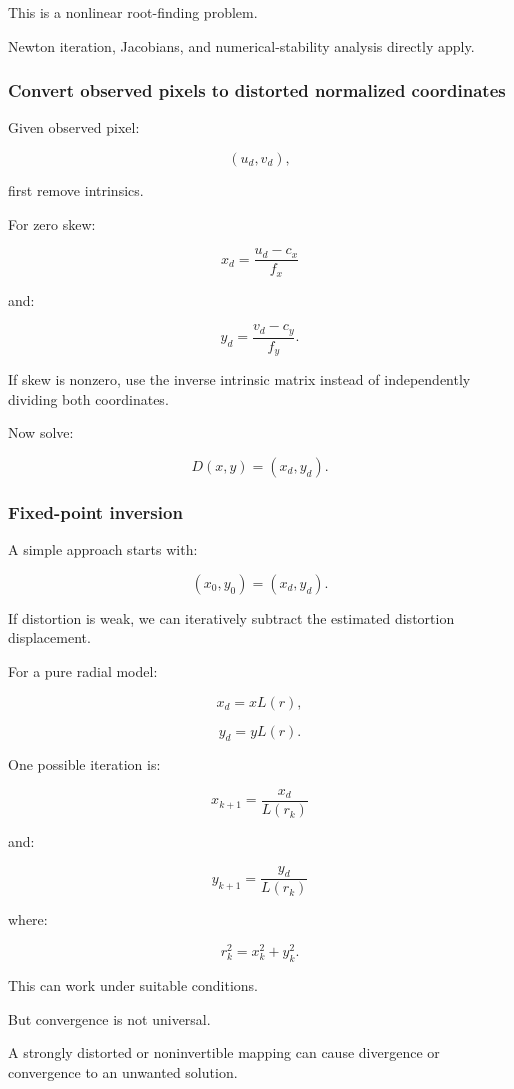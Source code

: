 This is a nonlinear root-finding problem.

Newton iteration, Jacobians, and numerical-stability analysis directly apply.

\subsubsection{Convert observed pixels to distorted normalized coordinates}\label{convert-observed-pixels-to-distorted-normalized-coordinates}

Given observed pixel:

\[
 (u_d,v_d),
\]

first remove intrinsics.

For zero skew:

\[
 \boxed{ x_d=\frac{u_d-c_x}{f_x} }
\]

and:

\[
 \boxed{ y_d=\frac{v_d-c_y}{f_y} }.
\]

If skew is nonzero, use the inverse intrinsic matrix instead of independently dividing both coordinates.

Now solve:

\[
 D(x,y)=(x_d,y_d).
\]

\subsubsection{Fixed-point inversion}\label{fixed-point-inversion}

A simple approach starts with:

\[
 \boxed{ (x_0,y_0)=(x_d,y_d) }.
\]

If distortion is weak, we can iteratively subtract the estimated distortion displacement.

For a pure radial model:

\[
 x_d=xL(r),
\]

\[
 y_d=yL(r).
\]

One possible iteration is:

\[
 \boxed{ x_{k+1}=\frac{x_d}{L(r_k)} }
\]

and:

\[
 \boxed{ y_{k+1}=\frac{y_d}{L(r_k)} }
\]

where:

\[
 r_k^2=x_k^2+y_k^2.
\]

This can work under suitable conditions.

But convergence is not universal.

A strongly distorted or noninvertible mapping can cause divergence or convergence to an unwanted solution.

